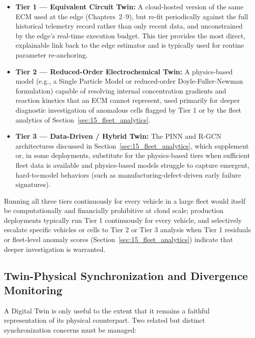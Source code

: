 \begin{itemize}
    \item \textbf{Tier 1 — Equivalent Circuit Twin:} A cloud-hosted version of the same ECM used at the edge (Chapters~2–9), but re-fit periodically against the full historical telemetry record rather than only recent data, and unconstrained by the edge's real-time execution budget. This tier provides the most direct, explainable link back to the edge estimator and is typically used for routine parameter re-anchoring.
    \item \textbf{Tier 2 — Reduced-Order Electrochemical Twin:} A physics-based model (e.g., a Single Particle Model or reduced-order Doyle-Fuller-Newman formulation) capable of resolving internal concentration gradients and reaction kinetics that an ECM cannot represent, used primarily for deeper diagnostic investigation of anomalous cells flagged by Tier 1 or by the fleet analytics of Section~\ref{sec:15_fleet_analytics}.
    \item \textbf{Tier 3 — Data-Driven / Hybrid Twin:} The PINN and R-GCN architectures discussed in Section~\ref{sec:15_fleet_analytics}, which supplement or, in some deployments, substitute for the physics-based tiers when sufficient fleet data is available and physics-based models struggle to capture emergent, hard-to-model behaviors (such as manufacturing-defect-driven early failure signatures).
\end{itemize}

Running all three tiers continuously for every vehicle in a large fleet would itself be computationally and financially prohibitive at cloud scale; production deployments typically run Tier 1 continuously for every vehicle, and selectively escalate specific vehicles or cells to Tier 2 or Tier 3 analysis when Tier 1 residuals or fleet-level anomaly scores (Section~\ref{sec:15_fleet_analytics}) indicate that deeper investigation is warranted.

\subsection{Twin-Physical Synchronization and Divergence Monitoring}
\label{subsec:15_twin_sync}

A Digital Twin is only useful to the extent that it remains a faithful representation of its physical counterpart. Two related but distinct synchronization concerns must be managed:

